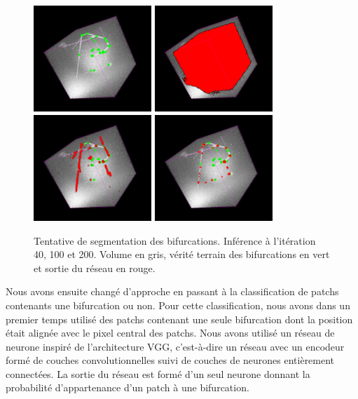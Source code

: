 \begin{figure}[ht]
    \centering
    \includegraphics[height=4cm]{Images/exp_seg_gt.png}
    \includegraphics[height=4cm]{Images/exp_seg_40.png}
    \includegraphics[height=4cm]{Images/exp_seg_100.png}
    \includegraphics[height=4cm]{Images/exp_seg_200.png}
    \caption{Tentative de segmentation des bifurcations. Inférence à l'itération 40, 100 et 200. Volume en gris, vérité terrain des bifurcations en vert et sortie du réseau en rouge. }
    \label{fig:seg_deep}
\end{figure}

Nous avons ensuite changé d'approche en passant à la classification de patchs contenants une bifurcation ou non. Pour cette classification, nous avons dans un premier temps utilisé des patchs contenant une seule bifurcation dont la position était alignée avec le pixel central des patchs. Nous avons utilisé un réseau de neurone inspiré de l'architecture VGG, c'est-à-dire un réseau avec un encodeur formé de couches convolutionnelles suivi de couches de neurones entièrement connectées. La sortie du réseau est formé d'un seul neurone donnant la probabilité d'appartenance d'un patch à une bifurcation. 

